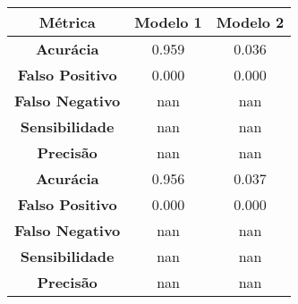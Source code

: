 \begin{tabular}{|c|c|c|}%
\hline%
\textbf{Métrica}&\textbf{Modelo 1}&\textbf{Modelo 2}\\%
\hline%
\textbf{Acurácia}&0.959&0.036\\%
\hline%
\textbf{Falso Positivo}&0.000&0.000\\%
\hline%
\textbf{Falso Negativo}&nan&nan\\%
\hline%
\textbf{Sensibilidade}&nan&nan\\%
\hline%
\textbf{Precisão}&nan&nan\\%
\hline%
\textbf{Acurácia}&0.956&0.037\\%
\hline%
\textbf{Falso Positivo}&0.000&0.000\\%
\hline%
\textbf{Falso Negativo}&nan&nan\\%
\hline%
\textbf{Sensibilidade}&nan&nan\\%
\hline%
\textbf{Precisão}&nan&nan\\%
\hline%
\end{tabular}